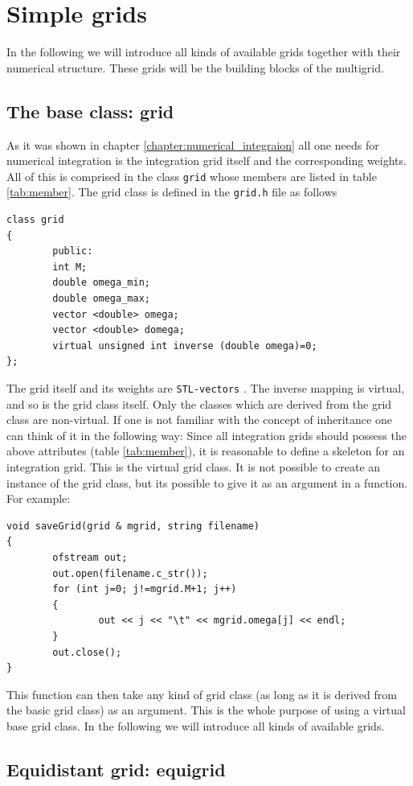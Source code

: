 \chapter{Simple grids} \label{chapter:simple_grids}
In the following we will introduce all kinds of available grids together with their numerical structure. These grids will be the building blocks of the multigrid.
\section{The base class: grid}
As it was shown in chapter \ref{chapter:numerical_integraion} all one needs for numerical integration is the integration grid itself and the corresponding weights. All of this is comprised in the class \texttt{grid} whose members are listed in table \ref{tab:member}. The grid class is defined in the \texttt{grid.h} file as follows

\begin{lstlisting}
class grid
{
        public:
        int M;
        double omega_min;
        double omega_max;
        vector <double> omega;
        vector <double> domega;
        virtual unsigned int inverse (double omega)=0;
};
\end{lstlisting}
The grid itself and its weights are \texttt{STL-vectors} \cite{stl}. The inverse mapping is virtual, and so is the grid class itself. Only the classes which are derived from the grid class are non-virtual. If one is not familiar with the concept of inheritance one can think of it in the following way: Since all integration grids should possess the above attributes (table \ref{tab:member}), it is reasonable to define a skeleton for an integration grid. This is the virtual grid class. It is not possible to create an instance of the grid class, but its possible to give it as an argument in a function. For example:
\begin{lstlisting}
void saveGrid(grid & mgrid, string filename)
{
        ofstream out;
        out.open(filename.c_str());
        for (int j=0; j!=mgrid.M+1; j++)
        {
                out << j << "\t" << mgrid.omega[j] << endl;
        }
        out.close();
}
\end{lstlisting}
This function can then take any kind of grid class (as long as it is derived from the basic grid class) as an argument. This is the whole purpose of using a virtual base grid class. In the following we will introduce all kinds of available grids.

\section{Equidistant grid: equigrid}\label{sec:equigrid}


